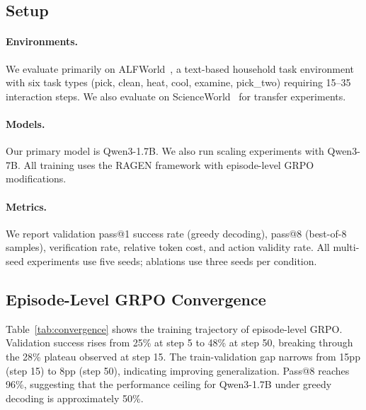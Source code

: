 \documentclass[10pt]{article}
\begin{document}
\subsection{Setup}

\paragraph{Environments.}
We evaluate primarily on ALFWorld~\citep{alfworld}, a text-based household task environment with six task types (pick, clean, heat, cool, examine, pick\_two) requiring 15--35 interaction steps. We also evaluate on ScienceWorld~\citep{scienceworld} for transfer experiments.

\paragraph{Models.}
Our primary model is Qwen3-1.7B. We also run scaling experiments with Qwen3-7B. All training uses the RAGEN framework with episode-level GRPO modifications.

\paragraph{Metrics.}
We report validation pass@1 success rate (greedy decoding), pass@8 (best-of-8 samples), verification rate, relative token cost, and action validity rate. All multi-seed experiments use five seeds; ablations use three seeds per condition.

\subsection{Episode-Level GRPO Convergence}

Table~\ref{tab:convergence} shows the training trajectory of episode-level GRPO. Validation success rises from 25\% at step 5 to 48\% at step 50, breaking through the 28\% plateau observed at step 15. The train-validation gap narrows from 15pp (step 15) to 8pp (step 50), indicating improving generalization. Pass@8 reaches 96\%, suggesting that the performance ceiling for Qwen3-1.7B under greedy decoding is approximately 50\%.
\end{document}
